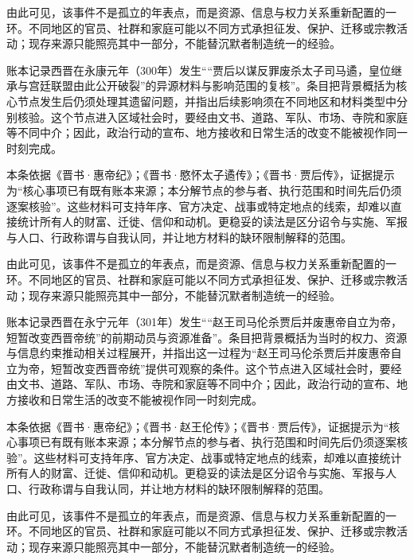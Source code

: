由此可见，该事件不是孤立的年表点，而是资源、信息与权力关系重新配置的一环。不同地区的官员、社群和家庭可能以不同方式承担征发、保护、迁移或宗教活动；现存来源只能照亮其中一部分，不能替沉默者制造统一的经验。

账本记录西晋在永康元年（300年）发生““贾后以谋反罪废杀太子司马遹，皇位继承与宫廷联盟由此公开破裂”的异源材料与影响范围的复核”。条目把背景概括为核心节点发生后仍须处理其遗留问题，并指出后续影响须在不同地区和材料类型中分别核验。这个节点进入区域社会时，要经由文书、道路、军队、市场、寺院和家庭等不同中介；因此，政治行动的宣布、地方接收和日常生活的改变不能被视作同一时刻完成。

本条依据《晋书·惠帝纪》；《晋书·愍怀太子遹传》；《晋书·贾后传》，证据提示为“核心事项已有既有账本来源；本分解节点的参与者、执行范围和时间先后仍须逐案核验”。这些材料可支持年序、官方决定、战事或特定地点的线索，却难以直接统计所有人的财富、迁徙、信仰和动机。更稳妥的读法是区分诏令与实施、军报与人口、行政称谓与自我认同，并让地方材料的缺环限制解释的范围。

由此可见，该事件不是孤立的年表点，而是资源、信息与权力关系重新配置的一环。不同地区的官员、社群和家庭可能以不同方式承担征发、保护、迁移或宗教活动；现存来源只能照亮其中一部分，不能替沉默者制造统一的经验。

账本记录西晋在永宁元年（301年）发生““赵王司马伦杀贾后并废惠帝自立为帝，短暂改变西晋帝统”的前期动员与资源准备”。条目把背景概括为当时的权力、资源与信息约束推动相关过程展开，并指出这一过程为“赵王司马伦杀贾后并废惠帝自立为帝，短暂改变西晋帝统”提供可观察的条件。这个节点进入区域社会时，要经由文书、道路、军队、市场、寺院和家庭等不同中介；因此，政治行动的宣布、地方接收和日常生活的改变不能被视作同一时刻完成。

本条依据《晋书·惠帝纪》；《晋书·赵王伦传》；《晋书·贾后传》，证据提示为“核心事项已有既有账本来源；本分解节点的参与者、执行范围和时间先后仍须逐案核验”。这些材料可支持年序、官方决定、战事或特定地点的线索，却难以直接统计所有人的财富、迁徙、信仰和动机。更稳妥的读法是区分诏令与实施、军报与人口、行政称谓与自我认同，并让地方材料的缺环限制解释的范围。

由此可见，该事件不是孤立的年表点，而是资源、信息与权力关系重新配置的一环。不同地区的官员、社群和家庭可能以不同方式承担征发、保护、迁移或宗教活动；现存来源只能照亮其中一部分，不能替沉默者制造统一的经验。

